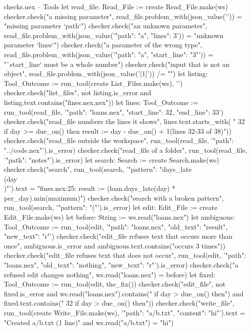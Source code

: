 \begin{continued}{checks.nex}
-- Tools
let read_file: Read_File := create Read_File.make(ws)
checker.check("a missing parameter", read_file.problem_with(json_value('{}')) = "missing parameter `path`")
checker.check("an unknown parameter",
  read_file.problem_with(json_value('{"path": "a", "lines": 3}')) = "unknown parameter `lines`")
checker.check("a parameter of the wrong type",
  read_file.problem_with(json_value('{"path": "a", "start_line": "3"}')) = "`start_line` must be a whole number")
checker.check("input that is not an object", read_file.problem_with(json_value('[1]')) /= "")
let listing: Tool_Outcome := run_tool(create List_Files.make(ws), '{}')
checker.check("list_files", not listing.is_error and listing.text.contains("fines.nex\nloans.nex\n"))
let lines: Tool_Outcome := run_tool(read_file, '{"path": "loans.nex", "start_line": 32, "end_line": 33}')
checker.check("read_file numbers the lines it shows", lines.text.starts_with(
  "   32      if day >= due_on() then        result := day - due_on() + 1\n(lines 32-33 of 38)"))
checker.check("read_file outside the workspace", run_tool(read_file, '{"path": "../code.nex"}').is_error)
checker.check("read_file of a folder", run_tool(read_file, '{"path": "notes"}').is_error)
let search: Search := create Search.make(ws)
checker.check("search", run_tool(search, '{"pattern": "days_late\\(day\\)"}').text
  = "fines.nex:25: result := (loan.days_late(day) * per_day).min(maximum)\n")
checker.check("search with a broken pattern", run_tool(search, '{"pattern": "("}').is_error)
let edit: Edit_File := create Edit_File.make(ws)
let before: String := ws.read("loans.nex")
let ambiguous: Tool_Outcome := run_tool(edit, '{"path": "loans.nex", "old_text": "result", "new_text": "r"}')
checker.check("edit_file refuses text that occurs more than once",
  ambiguous.is_error and ambiguous.text.contains("occurs 3 times"))
checker.check("edit_file refuses text that does not occur",
  run_tool(edit, '{"path": "loans.nex", "old_text": "nothing", "new_text": "r"}').is_error)
checker.check("a refused edit changes nothing", ws.read("loans.nex") = before)
let fixed: Tool_Outcome := run_tool(edit, the_fix())
checker.check("edit_file", not fixed.is_error and ws.read("loans.nex").contains("    if day > due_on() then\n")
  and fixed.text.contains("   32      if day > due_on() then"))
checker.check("write_file", run_tool(create Write_File.make(ws), '{"path": "a/b.txt", "content": "hi\n"}').text
  = "Created a/b.txt (1 line)" and ws.read("a/b.txt") = "hi\n")

\end{continued}
